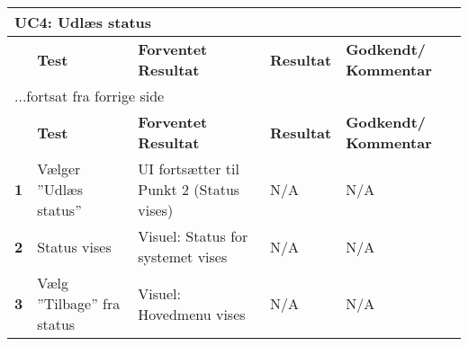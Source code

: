 
\begin{center}
\begin{longtable}{|p{}|p{}|p{}|p{}|p{}|} %
\hline
\multicolumn{5}{|l|}{\textbf{UC4: Udlæs status}} \\ \hline
\multicolumn{1}{|c|}{} &
\textbf{Test} &
\textbf{Forventet \newline Resultat} &
\textbf{Resultat} &
\textbf{Godkendt/ \newline Kommentar} \\ \hline 
\endfirsthead

\multicolumn{5}{l}{...fortsat fra forrige side} \\ \hline 
\multicolumn{1}{|c|}{} &
\textbf{Test} &
\textbf{Forventet \newline Resultat} &
\textbf{Resultat} &
\textbf{Godkendt/ \newline Kommentar} \\ \hline 
\endhead


\textbf{1} &
Vælger ''Udlæs status'' &
UI fortsætter til Punkt 2 (Status vises) &
N/A &
N/A \\\hline
\textbf{2} &
Status vises &
Visuel: Status for systemet vises &
N/A &
N/A \\\hline
\textbf{3} &
Vælg ''Tilbage'' fra status &
Visuel: Hovedmenu vises &
N/A &
N/A \\\hline
	\end{longtable}
	\label{ATUC4} 
\end{center}